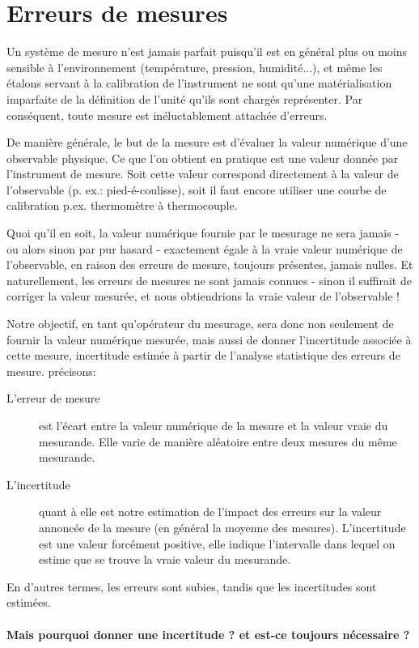 
\chapter{Erreurs de mesures}
Un système de mesure n'est jamais parfait puisqu'il est en général plus ou moins sensible à l'environnement (température, pression, humidité...), et même les étalons servant à la calibration de l'instrument ne sont qu'une matérialisation imparfaite de la définition de l'unité qu'ils sont chargés représenter. Par conséquent, toute mesure est inéluctablement attachée d'erreurs.

De manière générale, le but de la mesure est d'évaluer la valeur numérique d'une observable physique. Ce que l'on obtient en pratique est une valeur donnée par l'instrument de mesure. Soit cette valeur correspond directement à la valeur de l'observable (p. ex.: pied-é-coulisse), soit il faut encore utiliser une courbe de calibration p.ex. thermomètre à thermocouple.

Quoi qu'il en soit, la valeur numérique fournie par le mesurage ne sera jamais - ou alors sinon par pur hasard - exactement égale à la vraie valeur numérique de l'observable, en raison des erreurs de mesure, toujours présentes, jamais nulles. Et naturellement, les erreurs de mesures ne sont jamais connues - sinon il suffirait de corriger la valeur mesurée, et nous obtiendrions la vraie valeur de l'observable !

Notre objectif, en tant qu'opérateur du mesurage, sera donc non seulement de fournir la valeur numérique mesurée, mais aussi de donner l'incertitude associée à cette mesure, incertitude estimée à partir de l'analyse statistique des erreurs de mesure. précisons:

\begin{description}
    \item[L'erreur de mesure] est l'écart entre la valeur numérique de la mesure et la valeur vraie du mesurande. Elle varie de manière aléatoire entre deux mesures du même mesurande.
    \item[L'incertitude] quant à elle est notre estimation de l'impact des erreurs sur la valeur annoncée de la mesure (en général la moyenne des mesures). L'incertitude est une valeur forcément positive, elle indique l'intervalle dans lequel on estime que se trouve la vraie valeur du mesurande.
\end{description}
En d'autres termes, les erreurs sont subies, tandis que les incertitudes sont estimées.

\subsubsection*{Mais pourquoi donner une incertitude ? et est-ce toujours nécessaire ?}

